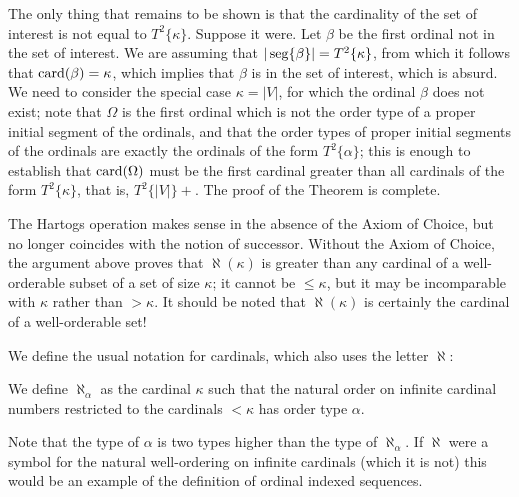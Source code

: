 The only thing that remains to be shown is that the cardinality of the
set of interest is not equal to $T^2\{\kappa\}$.  Suppose it were.
Let $\beta$ be the first ordinal not in the set of interest.  We are
assuming that $|\mathop{\mathrm{seg}}\{\beta\}| = T^2\{\kappa\}$, from which it
follows that $\mathop{\mathrm{card}}(\beta) = \kappa$, which implies that $\beta$
is in the set of interest, which is absurd.  We need to consider the
special case $\kappa=|V|$, for which the ordinal $\beta$ does not
exist; note that $\Omega$ is the first ordinal which is not the order
type of a proper initial segment of the ordinals, and
that the order types of proper initial segments of the ordinals are exactly the
ordinals of the form $T^2\{\alpha\}$; this is enough to establish that
$\mathop{\mathrm{card}}(\Omega)$ must be the first cardinal greater than
all cardinals of the form $T^2\{\kappa\}$, that is, $T^2\{|V|\}+$. The proof of
the Theorem is complete.
\finpreuve

The Hartogs operation makes sense in the absence of the Axiom of
Choice, but no longer coincides with the notion of
successor.  Without 
the Axiom of Choice, the argument above proves that $\aleph(\kappa)$
is greater than any cardinal of a
well-orderable subset of a set of 
size $\kappa$; it cannot be $\leq\kappa$, but it may be incomparable
with $\kappa$ rather than $>\kappa$.  It should be noted that
$\aleph(\kappa)$ is certainly the cardinal of a well-orderable set!

We define the usual notation for cardinals, which also uses the letter
$\aleph$:

\begin{definition}
 We define $\aleph_{\alpha}$ as the cardinal
 $\kappa$ such that the natural order on infinite
 cardinal numbers restricted to the cardinals $< \kappa$ has order
 type $\alpha$.
\end{definition}

Note that the type of $\alpha$ is two types higher than
the type of 
$\aleph_{\alpha}$.  If $\aleph$ were a symbol for the natural
well-ordering on infinite cardinals (which it is not) this would be an 
example of the definition of ordinal indexed
sequences. 

